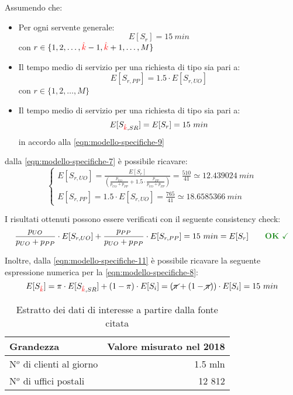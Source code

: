 Assumendo che:
\begin{itemize}
\item Per ogni servente generale:
\begin{equation}
\label{eqn:modello-specifiche-9}
E[S_r] = 15\ min
\end{equation}
con $r \in \lbrace 1, 2, \dots, {\color{red}\hat{k}}-1, {\color{red}\hat{k}}+1, \dots, M\rbrace$
\item Il tempo medio di servizio per una richiesta di tipo \pp{} sia pari a:
\begin{equation}
E[S_{r, PP}] = 1.5 \cdot E[S_{r, UO}]
\end{equation}
con $r \in \lbrace 1, 2, \dots, M\rbrace$
\item Il tempo medio di servizio per una richiesta di tipo \sr{} sia pari a:
\begin{equation}
\label{eqn:modello-specifiche-11}
E[S_{{\color{red}\hat{k}}, SR}] = E[S_r] = 15\ min
\end{equation}
in accordo alla \ref{eqn:modello-specifiche-9}
\end{itemize}
dalla \ref{eqn:modello-specifiche-7} è possibile ricavare:
\begin{equation}
\label{eqn:modello-specifiche-12}
\begin{cases}
E[S_{r,UO}] = \frac{E[S_r]}{(\frac{p_{UO}}{p_{UO} + p_{PP}} + 1.5\cdot \frac{p_{PP}}{p_{UO} + p_{PP}})} = \frac{510}{41} \simeq 12.439024\ min \\[2em]
E[S_{r,PP}] = 1.5\cdot E[S_{r,UO}] = \frac{765}{41} \simeq 18.6585366\ min
\end{cases}
\end{equation}

I risultati ottenuti possono essere verificati con il seguente consistency check:
\begin{equation}
\frac{p_{UO}}{p_{UO} + p_{PP}} \cdot E[S_{r, UO}] +  \frac{p_{PP}}{p_{UO} + p_{PP}} \cdot E[S_{r, PP}] = 15\ min = E[S_r]\qquad \text{\color{forestgreen}\textbf{OK} \checkmark}
\end{equation}

Inoltre, dalla \ref{eqn:modello-specifiche-11} è possibile ricavare la seguente espressione numerica per la \ref{eqn:modello-specifiche-8}:
\begin{equation}
E[S_{\color{red}\hat{k}}] = \pi \cdot E[S_{{\color{red}\hat{k}}, SR}] + (1-\pi) \cdot E[S_i] = (\cancel{\pi} + (1 - \cancel{\pi}))\cdot E[S_i] = 15\ min
\end{equation}

\begin{table}[ht]
\centering
{\tablecolors
\begin{tabular}{| l | r |}
\hline
Grandezza & Valore misurato nel 2018 \\
\hline
N$^o$ di clienti al giorno & 1.5 mln \\
\hline
N$^o$ di uffici postali & 12 812 \\
\hline
\end{tabular}}
\caption{Estratto dei dati di interesse a partire dalla fonte citata}
\label{table:modello-specifiche-3}
\end{table}

